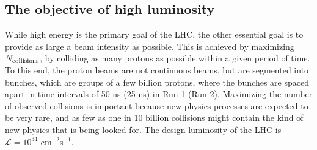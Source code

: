 \subsection{The objective of high luminosity}
While high energy is the primary goal of the LHC, the other essential goal is to provide as large a beam intensity as possible. This is achieved by maximizing $N_{\rm collisions}$, by colliding as many protons as possible within a given period of time. To this end, the proton beams are not continuous beams, but are segmented into bunches, which are groups of a few billion protons, where the bunches are spaced apart in time intervals of 50 ns (25 ns) in Run 1 (Run 2). Maximizing the number of observed collisions is important because new physics processes are expected to be very rare, and as few as one in 10 billion collisions might contain the kind of new physics that is being looked for. The design luminosity of the LHC is $\mathcal{L}=10^{34}$ cm$^{-2}$s$^{-1}$.

